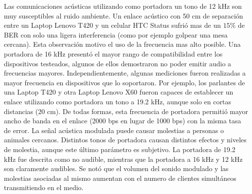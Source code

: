 Las comunicaciones acústicas utilizando como portadora un tono de 12 kHz son muy susceptibles al ruido ambiente. Un enlace acústico con 50 cm de separación entre un Laptop Lenovo T420 y un celular HTC Status sufrió mas de un $15\%$ de BER con solo una ligera interferencia (como por ejemplo golpear una mesa cercana). Esta observación motivo el uso de la frecuencia mas alto posible. Una portadora de 16 kHz presentó el mayor rango de compatibilidad entre los dispositivos testeados, algunos de ellos demostraron no poder emitir audio a frecuencias mayores.
Independientemente, algunas mediciones fueron realizadas a mayor frecuencia en dispositivos que lo soportaron. Por ejemplo, los parlantes de una Laptop T420 y otra Laptop Lenovo X60 fueron capaces de establecer un enlace utilizando como portadora un tono a 19.2 kHz, aunque solo en cortas distancias (20 cm). De todas formas, esta frecuencia de portadora permitió mayor ancho de banda en el enlace (2000 bps en lugar de 1000 bps) con la misma tasa de error.
La señal acústica modulada puede causar molestias a personas o animales cercanos. Distintos tonos de portadora causan distintos efectos y niveles de molestia, aunque este último parámetro es subjetivo. La portadora de 19.2 kHz fue descrita como no audible, mientras que la portadora a 16 kHz y 12 kHz son claramente audibles. Se notó que el volumen del sonido modulado y las molestias asociadas al mismo aumentan con el numero de clientes simultáneos transmitiendo en el medio.

%
